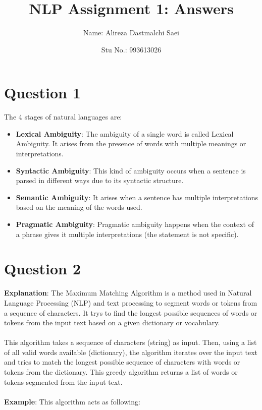\documentclass{article}
\title{\textbf{\Huge NLP Assignment 1: Answers}}
\author{Name: Alireza Dastmalchi Saei}
\date{Stu No.: 993613026}
\begin{document}
\maketitle

\pagebreak

\section{Question 1}
The 4 stages of natural languages are:
\begin{itemize}
    \item \textbf{Lexical Ambiguity}: The ambiguity of a single word is called Lexical Ambiguity. It arises from the presence of words with multiple meanings or interpretations.

    \item \textbf{Syntactic Ambiguity}: This kind of ambiguity occurs when a sentence is parsed in different ways due to its syntactic structure.

    \item \textbf{Semantic Ambiguity}: It arises when a sentence has multiple interpretations based on the meaning of the words used.

    \item \textbf{Pragmatic Ambiguity}: Pragmatic ambiguity happens when the context of a phrase gives it multiple interpretations (the statement is not specific).

\end{itemize}
\pagebreak

\section{Question 2}
\textbf{Explanation}: The Maximum Matching Algorithm is a method used in Natural Language Processing (NLP) and text processing to segment words or tokens from a sequence of characters. It trys to find the longest possible sequences of words or tokens from the input text based on a given dictionary or vocabulary.\\\\
This algorithm takes a sequence of characters (string) as input. Then, using a list of all valid words available (dictionary), the algorithm iterates over the input text and tries to match the longest possible sequence of characters with words or tokens from the dictionary. This greedy algorithm returns a list of words or tokens segmented from the input text.\\\\
\textbf{Example}: This algorithm acts as following:
\end{document}
